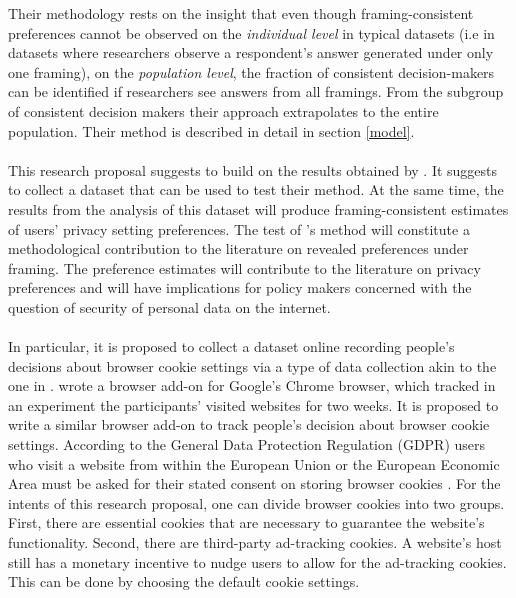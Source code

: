 Their methodology rests on the insight that even though framing-consistent preferences cannot be observed on the \textit{individual level} in typical datasets (i.e in datasets where researchers
observe a respondent's answer generated under only one framing), 
on the \textit{population level}, the fraction of consistent decision-makers can be identified if researchers see answers from all framings. From the subgroup of consistent decision makers their approach
extrapolates to the entire population. Their method is described in detail in section \ref{model}.
\\
\\
This research proposal suggests to build on the results obtained by \textcite{goldin2020}. It suggests to collect a dataset that can be used to test their method. At the
same time, the results from the analysis of this dataset will produce framing-consistent estimates of users' privacy setting preferences. The test of \textcite{goldin2020}'s method
will constitute a methodological contribution to the literature on revealed preferences under framing. %
The preference estimates will contribute to the literature on
privacy preferences and will have implications for policy makers concerned with the question of security of personal data on the internet.
\\
\\
In particular, it is proposed to collect a dataset online recording people's decisions about browser cookie settings via a type of data collection
akin to the one in \textcite{levy2020}. \textcite{levy2020} wrote a browser add-on for Google's Chrome browser, which tracked in an experiment
the participants' visited websites for two weeks. It is proposed to write a similar browser add-on to track people's decision about browser cookie settings.
According to the General Data Protection Regulation (GDPR) users who visit a website from within the European Union or the European Economic Area must be asked for their
stated consent on storing browser cookies \parencite{GDPR}. For the intents of this research proposal, one can divide browser cookies into two groups.
First, there are essential cookies that are necessary to guarantee the website's functionality. Second, there are third-party ad-tracking cookies. 
A website's host still has a monetary incentive to nudge users to allow for the ad-tracking cookies. This can be done by choosing the default cookie settings.

